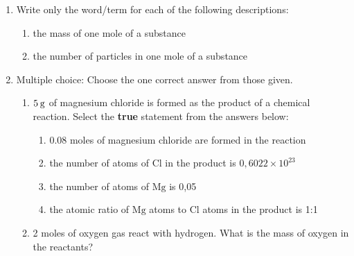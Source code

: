       \label{m38712*id286171}\begin{enumerate}[noitemsep, label=\textbf{\arabic*}. ] 
            \label{m38712*uid123}\item Write only the word/term for each of the following descriptions:
\label{m38712*id286187}\begin{enumerate}[noitemsep, label=\textbf{\alph*}. ] 
            \label{m38712*uid124}\item the mass of one mole of a substance
\label{m38712*uid125}\item the number of particles in one mole of a substance
\end{enumerate}
                \label{m38712*uid126}\item Multiple choice: Choose the one correct answer from those given.
\label{m38712*id286228}\begin{enumerate}[noitemsep, label=\textbf{\alph*}. ] 
            \label{m38712*uid127}\item \begin{math}5\phantom{\rule{2pt}{0ex}}\mathrm{g}\end{math} of magnesium chloride is formed as the product of a chemical reaction. Select the \textbf{true} statement from the answers below:
\label{m38712*id286251}\begin{enumerate}[noitemsep, label=\textbf{\alph*}. ] 
            \label{m38712*uid128}\item 0.08 moles of magnesium chloride are formed in the reaction
\label{m38712*uid129}\item the number of atoms of \begin{math}\mathrm{Cl}\end{math} in the product is \begin{math}0,6022\ensuremath{\times}{10}^{23}\end{math}\label{m38712*uid130}\item the number of atoms of \begin{math}\mathrm{Mg}\end{math} is 0,05
\label{m38712*uid131}\item the atomic ratio of \begin{math}\mathrm{Mg}\end{math} atoms to \begin{math}\mathrm{Cl}\end{math} atoms in the product is 1:1
\end{enumerate}
                \label{m38712*uid132}\item 2 moles of oxygen gas react with hydrogen. What is the mass of oxygen in the reactants?

\end{enumerate}
\end{enumerate}
